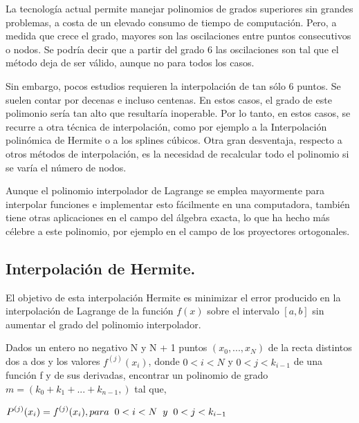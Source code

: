 \hspace{0.4cm} La tecnolog\'ia actual permite manejar polinomios de grados superiores sin grandes problemas, a costa de un elevado consumo de tiempo de computaci\'on. Pero, a medida que crece el grado, mayores son las oscilaciones entre puntos consecutivos o nodos. Se podr\'ia decir que a partir del grado 6 las oscilaciones son tal que el m\'etodo deja de ser v\'alido, aunque no para todos los casos.

\hspace{0.4cm} Sin embargo, pocos estudios requieren la interpolaci\'on de tan s\'olo 6 puntos. Se suelen contar por decenas e incluso centenas. En estos casos, el grado de este polimonio ser\'ia tan alto que resultar\'ia inoperable. Por lo tanto, en estos casos, se recurre a otra t\'ecnica de interpolaci\'on, como por ejemplo a la Interpolaci\'on polin\'omica de Hermite o a los splines c\'ubicos. Otra gran desventaja, respecto a otros m\'etodos de interpolaci\'on, es la necesidad de recalcular todo el polinomio si se var\'ia el n\'umero de nodos.

\hspace{0.4cm} Aunque el polinomio interpolador de Lagrange se emplea mayormente para interpolar funciones e implementar esto f\'acilmente en una computadora, tambi\'en tiene otras aplicaciones en el campo del \'algebra exacta, lo que ha hecho m\'as c\'elebre a este polinomio, por ejemplo en el campo de los proyectores ortogonales.

\subsection{Interpolaci\'on de Hermite.\\}

\hspace{0.4cm} El objetivo de esta interpolaci\'on Hermite es minimizar el error producido en la interpolaci\'on de Lagrange de la funci\'on $f(x)$ sobre el intervalo $[a, b]$ sin aumentar el grado del polinomio interpolador.


\hspace{0.4cm} Dados un entero no negativo N y  N + 1 puntos $(x_{0},..., x_{N})$ de la recta distintos dos a dos y los valores $f^{(j)} (x_{i})$, donde $0<i<N$ y $0<j<k_{i-1}$ de una funci\'on f y de sus derivadas, encontrar un polinomio de grado $m = (k_{0} +k_{1} +...+k_{n-1},)$ tal que,

\begin{center}
$\displaystyle{P^{(j)} (x_{i}) = f^{(j)} (x_{i}), para \hspace{0.2cm} 0<i<N \hspace{0.2cm}y \hspace{0.2cm} 0<j<k_{i-1}}$
\end{center}

